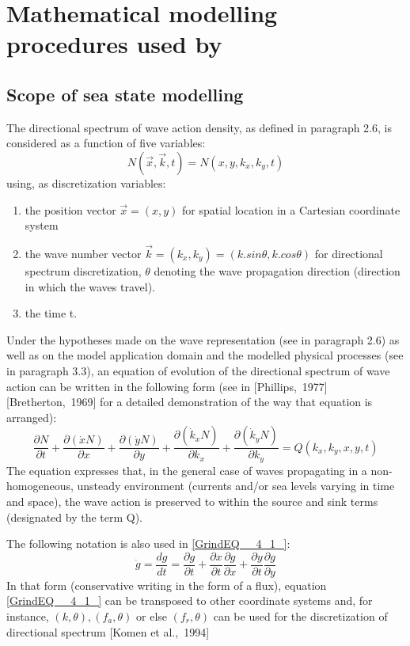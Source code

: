 
\chapter{Mathematical modelling procedures used by \tomawac}
\label{chapter4}
\section{ Scope of sea state modelling}
 The directional spectrum of wave action density, as defined in paragraph 2.6, is considered as a function of five variables:
\[N(\vec{x},\vec{k},t)=N(x,y,k_{x} ,k_{y} ,t)\]
using, as discretization variables:

 \begin{enumerate}
\item the position vector $\vec{x} = (x, y)$ for spatial location in a Cartesian coordinate system

 \item the wave number vector $\vec{k} = (k_x, k_y) = (k.sin \theta, k.cos \theta)$ for directional spectrum discretization, $\theta$ denoting the wave propagation direction (direction in which the waves travel).

 \item the time t.
\end{enumerate}

Under the hypotheses made on the wave representation (see in paragraph 2.6) as well as on the model application domain and the modelled physical processes (see in paragraph 3.3), an equation of evolution of the directional spectrum of wave action can be written in the following form (see in \cite{Willebrand1975} [Phillips,~1977] [Bretherton,~1969] for a detailed demonstration of the way that equation is arranged):
\begin{equation} \label{GrindEQ__4_1_}
\frac{\partial N}{\partial t} +\frac{\partial (\dot{x}N)}{\partial x} +\frac{\partial (\dot{y}N)}{\partial y} +\frac{\partial (\dot{k}_{x} N)}{\partial k_{x} } +\frac{\partial (\dot{k}_{y} N)}{\partial k_{y} } =Q(k_{x} ,k_{y} ,x,y,t)
\end{equation}
The equation expresses that, in the general case of waves propagating in a non-homogeneous, unsteady environment (currents and/or sea levels varying in time and space), the wave action is preserved to within the source and sink terms (designated by the term Q).

 The following notation is also used in \eqref{GrindEQ__4_1_}:
\[\dot{g}=\frac{dg}{dt} =\frac{\partial g}{\partial t} +\frac{\partial x}{\partial t} \frac{\partial g}{\partial x} +\frac{\partial y}{\partial t} \frac{\partial g}{\partial y} \]
In that form (conservative writing in the form of a flux), equation \eqref{GrindEQ__4_1_} can be transposed to other coordinate systems and, for instance, $(k,\theta), (f_a,\theta)$ or else $(f_r,\theta)$ can be used for the discretization of directional spectrum [Komen et al.,~1994] \cite{Tolman1991}

